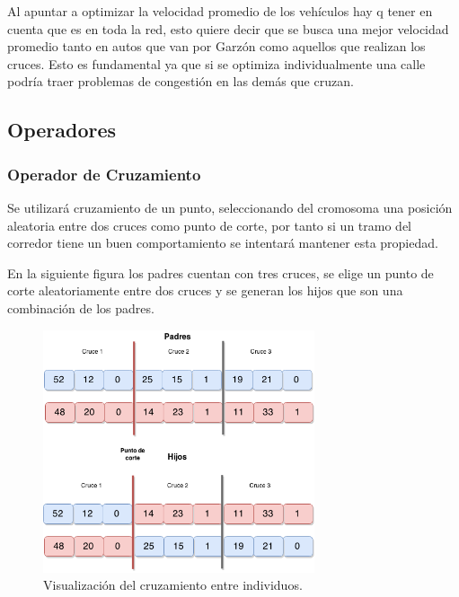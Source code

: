 Al apuntar a optimizar la velocidad promedio de los vehículos hay q tener en cuenta que es en toda la red, esto quiere decir que se busca una mejor velocidad promedio tanto en autos que van por Garzón como aquellos que realizan los cruces. Esto es fundamental ya que si se optimiza individualmente una calle podría traer problemas de congestión en las demás que cruzan.

\subsection{Operadores}
\subsubsection{Operador de Cruzamiento}
Se  utilizará cruzamiento de un punto, seleccionando del cromosoma una posición aleatoria entre dos cruces como punto de corte, por tanto si un tramo del corredor tiene un buen comportamiento se intentará mantener esta propiedad.

En la siguiente figura los padres cuentan con tres cruces, se elige un punto de corte aleatoriamente entre dos cruces y se generan los hijos que son una combinación de los padres.

\begin{figure}[H]
	\centering
	\includegraphics[width=8cm]{Figures/alg_cruzamiento}
	\caption{Visualización del cruzamiento entre individuos.}
	\label{fig:op_cruzamiento}
\end{figure}


\newpage
